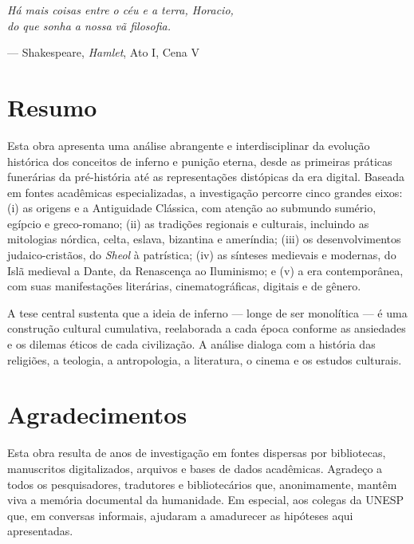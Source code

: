 \thispagestyle{empty}
\vspace*{3cm}
\begin{flushright}
\begin{minipage}{0.7\textwidth}
\itshape
Há mais coisas entre o céu e a terra, Horacio,\\
do que sonha a nossa vã filosofia.
\end{minipage}

\hfill --- Shakespeare, \textit{Hamlet}, Ato I, Cena V
\end{flushright}
\vfill
\clearpage

\chapter*{Resumo}

Esta obra apresenta uma análise abrangente e interdisciplinar da
evolução histórica dos conceitos de inferno e punição eterna, desde
as primeiras práticas funerárias da pré-história até as
representações distópicas da era digital. Baseada em fontes
acadêmicas especializadas, a investigação percorre cinco grandes
eixos: (i) as origens e a Antiguidade Clássica, com atenção ao
submundo sumério, egípcio e greco-romano; (ii) as tradições
regionais e culturais, incluindo as mitologias nórdica, celta,
eslava, bizantina e ameríndia; (iii) os desenvolvimentos judaico-cristãos,
do \emph{Sheol} à patrística; (iv) as sínteses medievais e modernas,
do Islã medieval a Dante, da Renascença ao Iluminismo; e (v) a era
contemporânea, com suas manifestações literárias, cinematográficas,
digitais e de gênero.

A tese central sustenta que a ideia de inferno --- longe de ser
monolítica --- é uma construção cultural cumulativa, reelaborada a
cada época conforme as ansiedades e os dilemas éticos de cada civilização.
A análise dialoga com a história das religiões, a teologia, a
antropologia, a literatura, o cinema e os estudos culturais.

\chapter*{Agradecimentos}

Esta obra resulta de anos de investigação em fontes dispersas por
bibliotecas, manuscritos digitalizados, arquivos e bases de dados
acadêmicas. Agradeço a todos os pesquisadores, tradutores e
bibliotecários que, anonimamente, mantêm viva a memória documental
da humanidade. Em especial, aos colegas da UNESP que, em conversas
informais, ajudaram a amadurecer as hipóteses aqui apresentadas.

